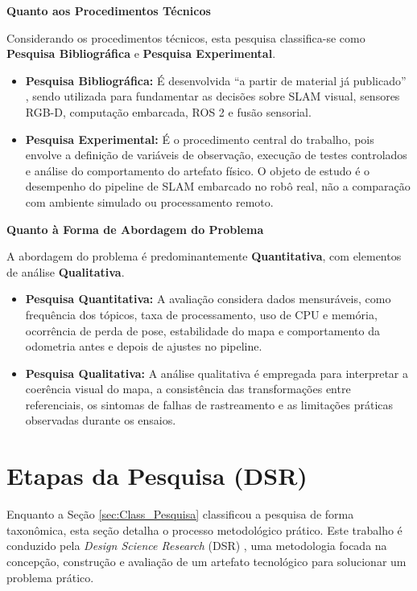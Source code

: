 \noindent\textbf{Quanto aos Procedimentos Técnicos}\par
Considerando os procedimentos técnicos, esta pesquisa classifica-se como \textbf{Pesquisa Bibliográfica} e \textbf{Pesquisa Experimental}.
\begin{itemize}
    \item \textbf{Pesquisa Bibliográfica:} É desenvolvida ``a partir de material já publicado'' \cite[p. 54]{prodanov2012metodologiatrabalhocientifico}, sendo utilizada para fundamentar as decisões sobre SLAM visual, sensores RGB-D, computação embarcada, ROS 2 e fusão sensorial.
    \item \textbf{Pesquisa Experimental:} É o procedimento central do trabalho, pois envolve a definição de variáveis de observação, execução de testes controlados e análise do comportamento do artefato físico. O objeto de estudo é o desempenho do pipeline de SLAM embarcado no robô real, não a comparação com ambiente simulado ou processamento remoto.
\end{itemize}

\noindent\textbf{Quanto à Forma de Abordagem do Problema}\par
A abordagem do problema é predominantemente \textbf{Quantitativa}, com elementos de análise \textbf{Qualitativa}.
\begin{itemize}
    \item \textbf{Pesquisa Quantitativa:} A avaliação considera dados mensuráveis, como frequência dos tópicos, taxa de processamento, uso de CPU e memória, ocorrência de perda de pose, estabilidade do mapa e comportamento da odometria antes e depois de ajustes no pipeline.
    \item \textbf{Pesquisa Qualitativa:} A análise qualitativa é empregada para interpretar a coerência visual do mapa, a consistência das transformações entre referenciais, os sintomas de falhas de rastreamento e as limitações práticas observadas durante os ensaios.
\end{itemize}

\section{Etapas da Pesquisa (DSR)}
\label{sec:etapas_dsr}

Enquanto a Seção \ref{sec:Class_Pesquisa} classificou a pesquisa de forma taxonômica, esta seção detalha o processo metodológico prático. Este trabalho é conduzido pela \emph{Design Science Research} (DSR) \cite{hevner2004designscienceinformation, dresch2015distinctiveanalysiscase}, uma metodologia focada na concepção, construção e avaliação de um artefato tecnológico para solucionar um problema prático.

